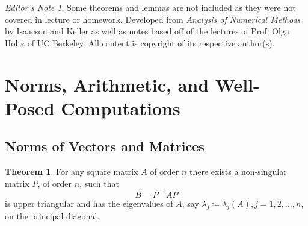 \documentclass[11pt,letterpaper]{article}
\numberwithin{figure}{section} %
\newcommand{\inv}[1]{#1^{-1}}
\theoremstyle{definition}
\newtheorem{theorem}{Theorem}[subsection]
\theoremstyle{definition}
\theoremstyle{definition}
\theoremstyle{definition}
\theoremstyle{remark}
\theoremstyle{remark}
\theoremstyle{definition}
\theoremstyle{remark}
\theoremstyle{remark}
\newtheorem*{ednote}{Editor's Note}
\begin{document}
\begin{multicols*}{3}

\begin{ednote}
	Some theorems and lemmas are not included as they were not covered in lecture
	or homework. Developed from \textit{Analysis of Numerical Methods} by
	Isaacson and Keller as well as notes based off of the lectures of Prof. Olga
	Holtz of UC Berkeley. All content is copyright of its respective author(s).
\end{ednote}
\section{Norms, Arithmetic, and Well-Posed Computations}
\subsection{Norms of Vectors and Matrices}
\begin{theorem}
	For any square matrix $A$ of order $n$ there exists a non-singular matrix $P$,
	of order $n$, such that
	\[
		B = \inv{P} A P
	\]
	is upper triangular and has the eigenvalues of $A$, say $\lambda_j \coloneqq
	\lambda_j(A), j = 1, 2, \ldots, n$, on the principal diagonal.


\end{theorem}
\end{multicols*}
\end{document}
